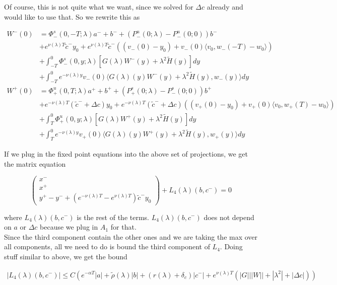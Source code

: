 \documentclass[12pt]{article}
\begin{document}
\begin{enumerate}
Of course, this is not quite what we want, since we solved for $\Delta c$ already and would like to use that. So we rewrite this as

\begin{align*}
W^-(0) &= \Phi^s_-(0, -T; \lambda )a^- + b^- + (P^u_-(0; \lambda) - P^u_-(0; 0))b^- \\
&+ e^{\nu(\lambda)T} \tilde{c}^- y_0 + e^{\nu(\lambda)T} \tilde{c}^- ( (v_-(0) - y_0) + v_-(0) \langle  v_0, w_-(-T) - w_0 \rangle) \\
&+ \int_{-T}^0 \Phi^s_-(0, y; \lambda) [ G(\lambda)W^-(y) + \lambda^2 \tilde{H}(y) ] dy \\
&+ \int_{-T}^0 
e^{-\nu(\lambda)y} v_-(0) \langle G(\lambda)(y)W^-(y) + \lambda^2 \tilde{H}(y), w_-(y) \rangle dy \\
W^+(0) &= \Phi^u_+(0, T; \lambda)a^+ + b^+ + (P^s_+(0; \lambda) - P^s_-(0; 0))b^+ \\
&+ e^{-\nu(\lambda)T} (\tilde{c}^- + \Delta c) y_0 + e^{-\nu(\lambda)T} (\tilde{c}^- + \Delta c) ( (v_+(0) - y_0) + v_+(0) \langle  v_0, w_+(T) - w_0 \rangle) \\
&+ \int_T^0 \Phi^u_+(0, y; \lambda) [ G(\lambda)W^+(y) + \lambda^2 \tilde{H}(y) ] dy \\
&+ \int_T^0 e^{-\nu(\lambda)y} v_+(0) \langle G(\lambda)(y)W^+(y) + \lambda^2 \tilde{H}(y), w_+(y) \rangle dy
\end{align*}


If we plug in the fixed point equations into the above set of projections, we get the matrix equation

\[
\begin{pmatrix}x^- \\ x^+ \\ y^+ - y^- + (e^{-\nu(\lambda)T} - e^{\nu(\lambda)T}) \tilde{c}^- y_0 \end{pmatrix} + L_4(\lambda)(b, c^-) = 0
\]

where $L_4(\lambda)(b, c^-)$ is the rest of the terms. $L_4(\lambda)(b, c^-)$ does not depend on $a$ or $\Delta c$ because we plug in $A_1$ for that.\\

Since the third component contain the other ones and we are taking the max over all components, all we need to do is bound the third component of $L_4$. Doing stuff similar to above, we get the bound

\begin{align*}
|L_4(\lambda)(b, c^-)| \leq C( e^{-\alpha T}|a| + \tilde{\rho}(\lambda)|b| + 
(r(\lambda) + \delta_c )|c^-| + e^{\nu(\lambda)T}( |G|||W|| + |\lambda^2| + |\Delta c| ))
\end{align*}


\end{enumerate}
\end{document}
